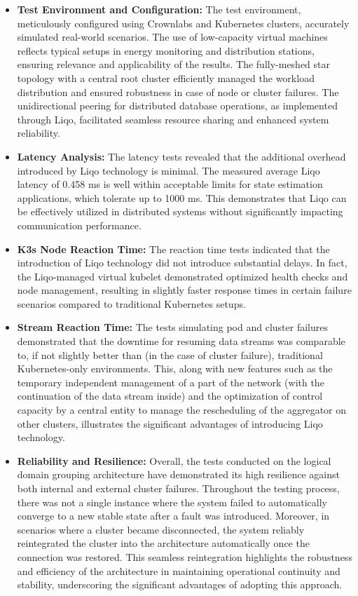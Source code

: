 \begin{itemize}
\item \textbf{Test Environment and Configuration:} The test environment, meticulously configured using Crownlabs and Kubernetes clusters, accurately simulated real-world scenarios. The use of low-capacity virtual machines reflects typical setups in energy monitoring and distribution stations, ensuring relevance and applicability of the results. The fully-meshed star topology with a central root cluster efficiently managed the workload distribution and ensured robustness in case of node or cluster failures. The unidirectional peering for distributed database operations, as implemented through Liqo, facilitated seamless resource sharing and enhanced system reliability.

\item \textbf{Latency Analysis:} The latency tests revealed that the additional overhead introduced by Liqo technology is minimal. The measured average Liqo latency of 0.458 ms is well within acceptable limits for state estimation applications, which tolerate up to 1000 ms. This demonstrates that Liqo can be effectively utilized in distributed systems without significantly impacting communication performance.

\item \textbf{K3s Node Reaction Time:} The reaction time tests indicated that the introduction of Liqo technology did not introduce substantial delays. In fact, the Liqo-managed virtual kubelet demonstrated optimized health checks and node management, resulting in slightly faster response times in certain failure scenarios compared to traditional Kubernetes setups.

\item \textbf{Stream Reaction Time:} The tests simulating pod and cluster failures demonstrated that the downtime for resuming data streams was comparable to, if not slightly better than (in the case of cluster failure), traditional Kubernetes-only environments. This, along with new features such as the temporary independent management of a part of the network (with the continuation of the data stream inside) and the optimization of control capacity by a central entity to manage the rescheduling of the aggregator on other clusters, illustrates the significant advantages of introducing Liqo technology.

\item \textbf{Reliability and Resilience:} Overall, the tests conducted on the logical domain grouping architecture have demonstrated its high resilience against both internal and external cluster failures. Throughout the testing process, there was not a single instance where the system failed to automatically converge to a new stable state after a fault was introduced. Moreover, in scenarios where a cluster became disconnected, the system reliably reintegrated the cluster into the architecture automatically once the connection was restored. This seamless reintegration highlights the robustness and efficiency of the architecture in maintaining operational continuity and stability, underscoring the significant advantages of adopting this approach.


\end{itemize}
